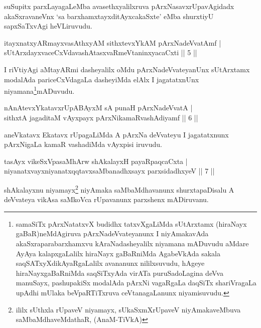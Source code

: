 \begin{artha}
suSupitx parxLayagaLeMba avasethxyalilxruva pArxNasavxrUpavAgidadx akaSxravaneVnx `sa barxhamxtayxditAyxcakaSxte' eMba shurxtiyU sapxSaTxvAgi heVLiruvudu.
\end{artha}%

\begin{shl}
itayxnatxyARmayxvasAthxyAM sithxtevxYkAM pArxNadeVvatAmf |\\
sUtArxdayxvaceCxVdavashAtasxvaRmeVtaninxyacaCxti \hfill || 5 ||
\end{shl}

\begin{artha}
I riVtiyAgi aMtayARmi dasheyalilx oMdu pArxNadeVvateyanUnx sUtArxtamx modalAda pariceCxVdagaLa dasheyiMda elAlx I jagatatxnUnx niyamana\footnote{samaSiTx pArxNatatxvX budidhx tatxvXgaLiMda sUtArxtamx (hiraNayx gaBaR)neMdAgiruva pArxNadeVvateyanunx I niyAmakavAda akaSxraparabarxhamxvu kAraNadasheyalilx niyamana mADuvudu aMdare AyAya kalapxgaLalilx hiraNayx gaBaRniMda AgabeVkAda sakala saqSATxyXdikAyaRgaLalilx avananunx nililxsuvudu, hAgeye hiraNayxgaBaRniMda saqSiTxyAda virATa puruSadoLagina deVva manuSayx, pashupakiSx modalAda pArxNi vagaRgaLa daqSiTx shariVragaLa upAdhi mUlaka beVpaRTiTxruva ceVtanagaLanunx niyamisuvudu.}mADuvudu.
\end{artha}

\begin{shl}
nAnAtevxYkatavxrUpABAyxM sA punaH pArxNadeVvatA |\\
sithxtA jagaditaM vAyxpayx pArxNikamaRvashAdiyamf \hfill || 6 ||
\end{shl}

\begin{artha}
aneVkatavx Ekatavx rUpagaLiMda A pArxNa deVvateyu I jagatatxnunx pArxNigaLa kamaR vashadiMda vAyxpisi iruvudu.
\end{artha}

\begin{shl}
tasAyx vikeSxVpasaMhArw shAkalayxH payaRpaqcaCxta |\\
niyanatxvayxniyanatxqqtavxsaMbanadhxsayx parxsidadhxyeV \hfill || 7 ||
\end{shl}

\begin{artha}
shAkalayxnu niyamayx\footnote{ililx sUthxla rUpaveV niyamayx, sUkaSxmXrUpaveV niyAmakaveMbuva saMbaMdhaveMdathaR, (AnaM-TiVkA)} niyAmaka saMbaMdhavanunx shurxtapaDisalu A deVvateya vikAsa saMkoVca rUpavanunx parxshenx mADiruvanu.
\end{artha}


